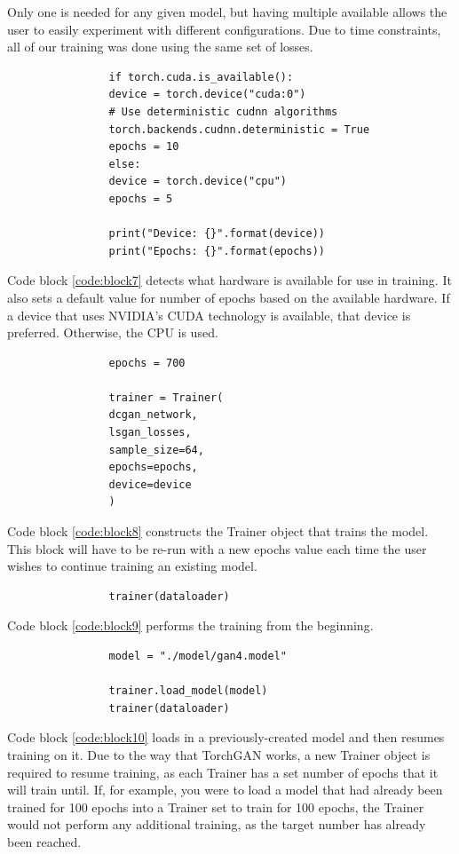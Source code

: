 \documentclass[11pt,letterpaper]{article}
\newenvironment{code}{\captionsetup{type=listing}}{}
\begin{document}
		Only one is needed for any given model, but having multiple available allows the user to easily experiment with different configurations.
		Due to time constraints, all of our training was done using the same set of losses.
		\begin{code}
			\caption{}
			\begin{verbatim}
				if torch.cuda.is_available():
				device = torch.device("cuda:0")
				# Use deterministic cudnn algorithms
				torch.backends.cudnn.deterministic = True
				epochs = 10
				else:
				device = torch.device("cpu")
				epochs = 5

				print("Device: {}".format(device))
				print("Epochs: {}".format(epochs))
			\end{verbatim}
			\label{code:block7}
		\end{code}
		Code block \ref{code:block7} detects what hardware is available for use in training.
		It also sets a default value for number of epochs based on the available hardware.
		If a device that uses NVIDIA's CUDA technology is available, that device is preferred.
		Otherwise, the CPU is used.
		\begin{code}
			\caption{}
			\begin{verbatim}
				epochs = 700

				trainer = Trainer(
				dcgan_network,
				lsgan_losses,
				sample_size=64,
				epochs=epochs,
				device=device
				)
			\end{verbatim}
			\label{code:block8}
		\end{code}
		Code block \ref{code:block8} constructs the Trainer object that trains the model.
		This block will have to be re-run with a new epochs value each time the user wishes to continue training an existing model.
		\begin{code}
			\caption{}
			\begin{verbatim}
				trainer(dataloader)
			\end{verbatim}
			\label{code:block9}
		\end{code}
		Code block \ref{code:block9} performs the training from the beginning.
		\begin{code}
			\caption{}
			\begin{verbatim}
				model = "./model/gan4.model"

				trainer.load_model(model)
				trainer(dataloader)
			\end{verbatim}
			\label{code:block10}
		\end{code}
		Code block \ref{code:block10} loads in a previously-created model and then resumes training on it.
		Due to the way that TorchGAN works, a new Trainer object is required to resume training, as each Trainer has a set number of epochs that it will train until.
		If, for example, you were to load a model that had already been trained for 100 epochs into a Trainer set to train for 100 epochs, the Trainer would not perform any additional training, as the target number has already been reached.
\end{document}
